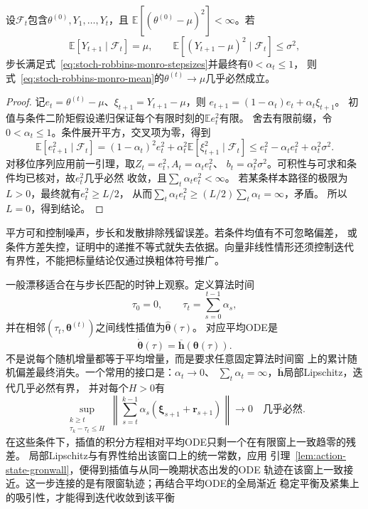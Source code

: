 \begin{theorem}[均值求根的几乎必然收敛]
  \label{thm:stoch-mean-root-convergence}
  设$\mathcal F_t$包含$\theta^{(0)},Y_1,\ldots,Y_t$，且
  $\mathbb E[(\theta^{(0)}-\mu)^2]<\infty$。若
  \[
    \mathbb E[Y_{t+1}\mid\mathcal F_t]=\mu,\qquad
    \mathbb E[(Y_{t+1}-\mu)^2\mid\mathcal F_t]\leq\sigma^2,
  \]
  步长满足式~\eqref{eq:stoch-robbins-monro-stepsizes}并最终有$0<\alpha_t\leq1$，
  则式~\eqref{eq:stoch-robbins-monro-mean}的$\theta^{(t)}\to\mu$几乎必然成立。
\end{theorem}
\begin{proof}
  记$e_t=\theta^{(t)}-\mu$、$\xi_{t+1}=Y_{t+1}-\mu$，则
  $e_{t+1}=(1-\alpha_t)e_t+\alpha_t\xi_{t+1}$。
  初值与条件二阶矩假设递归保证每个有限时刻的$\mathbb E e_t^2$有限。
  舍去有限前缀，令$0<\alpha_t\leq1$。条件展开平方，交叉项为零，得到
  \[
    \mathbb E[e_{t+1}^2\mid\mathcal F_t]
    =(1-\alpha_t)^2e_t^2
      +\alpha_t^2\mathbb E[\xi_{t+1}^2\mid\mathcal F_t]
    \leq e_t^2-\alpha_te_t^2+\alpha_t^2\sigma^2.
  \]
  对移位序列应用前一引理，取$Z_t=e_t^2,A_t=\alpha_te_t^2$、
  $b_t=\alpha_t^2\sigma^2$。可积性与可求和条件均已核对，故$e_t^2$几乎必然
  收敛，且$\sum_t\alpha_te_t^2<\infty$。
  若某条样本路径的极限为$L>0$，最终就有$e_t^2\geq L/2$，
  从而$\sum_t\alpha_te_t^2\geq(L/2)\sum_t\alpha_t=\infty$，矛盾。
  所以$L=0$，得到结论。
\end{proof}
平方可和控制噪声，步长和发散排除残留误差。若条件均值有不可忽略偏差，
或条件方差失控，证明中的递推不等式就失去依据。向量非线性情形还须控制迭代
有界性，不能把标量结论仅通过换粗体符号推广。

一般漂移适合在与步长匹配的时钟上观察。定义算法时间
\begin{equation}
  \tau_0=0,\qquad \tau_t=\sum_{s=0}^{t-1}\alpha_s,
  \label{eq:stoch-algorithmic-time}
\end{equation}
并在相邻$(\tau_t,\bm\theta^{(t)})$之间线性插值为$\widehat{\bm\theta}(\tau)$。
对应平均ODE是
\begin{equation}
  \dot{\bm\theta}(\tau)=\overline{\bm h}(\bm\theta(\tau)).
  \label{eq:stoch-mean-ode}
\end{equation}
不是说每个随机增量都等于平均增量，而是要求任意固定算法时间窗
上的累计随机偏差最终消失。一个常用的接口是：$\alpha_t\to0$、
$\sum_t\alpha_t=\infty$，$\overline{\bm h}$局部Lipschitz，迭代几乎必然有界，
并对每个$H>0$有
\[
  \sup_{\substack{k\geq t\\\tau_k-\tau_t\leq H}}
  \left\|\sum_{s=t}^{k-1}\alpha_s(\bm\xi_{s+1}+\bm r_{s+1})\right\|
  \longrightarrow0\quad\text{几乎必然}.
\]
在这些条件下，插值的积分方程相对平均ODE只剩一个在有限窗上一致趋零的残差。
局部Lipschitz与有界性给出该窗口上的统一常数，应用
引理~\ref{lem:action-state-gronwall}，便得到插值与从同一晚期状态出发的ODE
轨迹在该窗上一致接近。这一步连接的是有限窗轨迹；再结合平均ODE的全局渐近
稳定平衡及紧集上的吸引性，才能得到迭代收敛到该平衡

